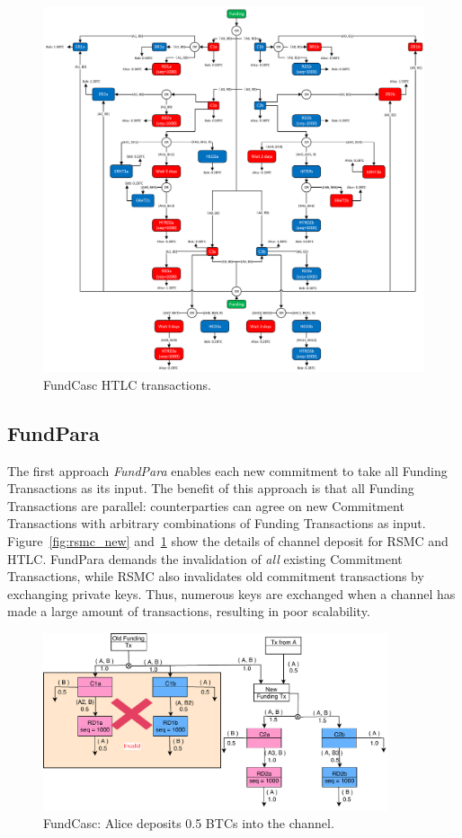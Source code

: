 \begin{figure}[H]
\centering
\includegraphics[width=6in]{figs/htlc_new.pdf}
\vspace{-6pt}
\caption{FundCasc HTLC transactions.}
\label{fig:htlc_new}
\end{figure}

\subsection{FundPara}


The first approach {\em FundPara} enables each new commitment to take all Funding Transactions as its input. The benefit of this approach is that all Funding Transactions are parallel: counterparties can agree on new Commitment
Transactions with arbitrary combinations of Funding Transactions as input.
Figure~\ref{fig:rsmc_new} and~\ref{fig:htlc_new} show the details of channel
deposit for RSMC and HTLC. FundPara demands the invalidation of {\em all} existing Commitment Transactions, while RSMC also invalidates old commitment transactions by exchanging private keys. Thus, numerous keys are exchanged when a channel has made a large amount of transactions, resulting in poor scalability.

\begin{figure}[H]
\centering
\includegraphics[width=4in]{figs/splice_in.pdf}
\vspace{-6pt}
\caption{FundCasc: Alice deposits 0.5 BTCs into the channel.}
\label{fig:splice_in}
\end{figure}

